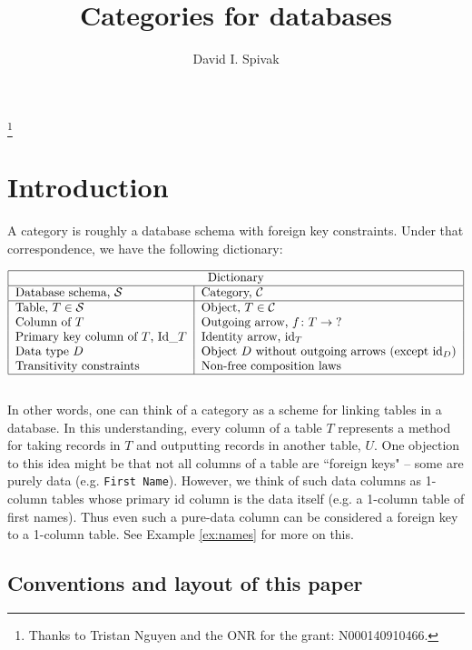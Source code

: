 \documentclass{amsart}
\def\tn{\textnormal}
\def\mc{\mathcal}
\def\to{\rightarrow}
\def\taking{\colon}
\def\id{\tn{id}}
\def\mcC{\mc{C}}
\def\mcS{\mc{S}}
\theoremstyle{remark}
\theoremstyle{definition}
\begin{document}
\title{Categories for databases}

\author{David I. Spivak}

\thanks{Thanks to Tristan Nguyen and the ONR for the grant: N000140910466.}

\maketitle

\tableofcontents

\section{Introduction}

A category is roughly a database schema with foreign key constraints.  Under that correspondence, we have the following dictionary:

\begin{align}\begin{tabular}{| l | l |}\hline\multicolumn{2}{| c |}{Dictionary}\\\hline Database schema, $\mcS$&Category, $\mcC$\\\hline Table, $T\in\mcS$&Object, $T\in\mcC$\\Column of $T$&Outgoing arrow, $f\taking T\to\; ?$\\Primary key column of $T$, Id\_$T$&Identity arrow, $\id_T$\\Data type $D$&Object $D$ without outgoing arrows (except $\id_D$)\\Transitivity constraints&Non-free composition laws\\\hline\end{tabular}\end{align}\\

In other words, one can think of a category as a scheme for linking tables in a database.  In this understanding, every column of a table $T$ represents a method for taking records in $T$ and outputting records in another table, $U$.  One objection to this idea might  be that not all columns of a table are ``foreign keys" -- some are purely data (e.g. {\tt First Name}).  However, we think of such data columns as 1-column tables whose primary id column is the data itself (e.g. a 1-column table of first names).  Thus even such a pure-data column can be considered a foreign key to a 1-column table.  See Example \ref{ex:names} for more on this.

\subsection{Conventions and layout of this paper}
\end{document}
